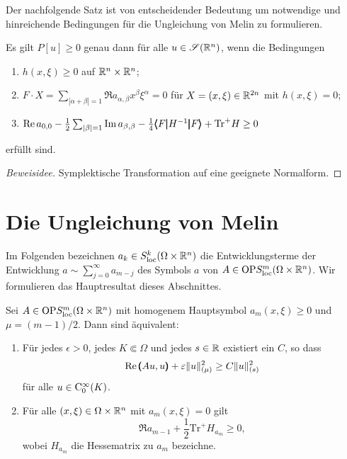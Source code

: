 Der nachfolgende Satz ist von entscheidender Bedeutung um notwendige und hinreichende Bedingungen für die Ungleichung von Melin zu formulieren.

\begin{thm}\label{satz:thm2.4}
Es gilt $P[u]\ge0$ genau dann für alle $u\in\mathscr S(\mathbb R^n)$, wenn die Bedingungen
\begin{enumerate}
\item  $h(x,\xi)\ge0$ auf $\mathbb R^n\times\mathbb R^n$;
\item $F \cdot X = \sum_{|\alpha+\beta|=1} \Re a_{\alpha,\beta} x^\beta\xi^\alpha = 0$ für $X=(x,\xi)\in\mathbb R^{2n}$ mit $h(x,\xi)=0$;
\item $\operatorname{Re} a_{0,0} - \frac12 \sum_{|\beta|=1} \operatorname{Im} a_{\beta,\beta} -\frac14  \pmb\langle F\pmb|H^{-1}\pmb|F\pmb\rangle + {\mathrm{Tr}}^+ H \ge 0$
\end{enumerate}
erfüllt sind.
\end{thm}
\begin{proof}[Beweisidee]
Symplektische Transformation auf eine geeignete Normalform. 
\end{proof}


\section{Die Ungleichung von Melin}
Im Folgenden bezeichnen $a_k\in S^{k}_\mathrm{loc}(\Omega\times\mathbb R^n)$ die Entwicklungsterme der Entwicklung $a\sim\sum_{j=0}^\infty a_{m-j}$ des Symbols $a$ von $A\in\mathrm{OP}S^{m}_{\rm loc}(\Omega\times\mathbb R^n)$. Wir formulieren das Hauptresultat dieses Abschnittes. 

\begin{thm}
Sei $A\in\mathrm{OP}S^{m}_{\rm loc}(\Omega\times\mathbb R^n)$ mit homogenem Hauptsymbol $a_m(x,\xi)\ge0$ und $\mu=(m-1)/2$. Dann sind \"aquivalent:
\begin{enumerate}
\item F\"ur jedes $\epsilon>0$, jedes $K\Subset\Omega$ und jedes $s\in\mathbb R$ existiert ein $C$, so dass
\begin{equation}
    \operatorname{Re} \pmb(Au,u\pmb) + \varepsilon \|u\|^2_{(\mu)}  \ge C\|u\|_{(s)}^2\label{ungleichungvonmelin}
\end{equation}
für alle $u\in\mathrm C_0^\infty(K)$.
\item
Für alle $(x,\xi)\in\Omega\times\mathbb R^n$ mit $a_m(x,\xi)=0$ gilt
\begin{equation}\label{bedfuerungleichung}
   \Re a_{m-1} +  \frac 1 2 {\mathrm{Tr}}^+ H_{a_m} \ge 0,
\end{equation}
wobei $H_{a_m}$ die Hessematrix zu $a_m$ bezeichne.
\end{enumerate}
\end{thm}

